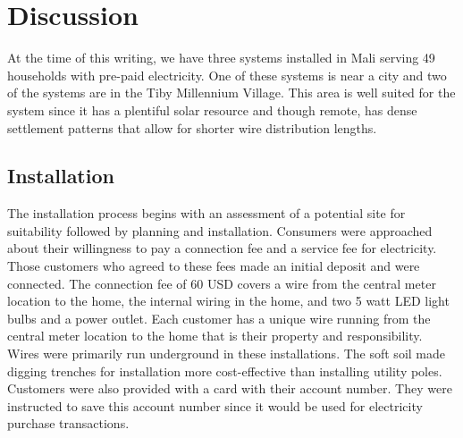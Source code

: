 \documentclass{sig-alternate}
\begin{document}
\section{Discussion}
At the time of this writing, we have three systems installed in Mali
serving 49 households with pre-paid electricity.
One of these systems is near a city and two of the systems are in the
Tiby Millennium Village.
This area is well suited for the system since it has
a plentiful solar resource and though remote, has dense settlement
patterns that allow for shorter wire distribution lengths.


\subsection{Installation}
The installation process begins with an assessment of a potential site for
suitability followed by planning and installation.
Consumers were
approached about their willingness to pay a connection fee and a service
fee for electricity.
Those customers who agreed to these fees made an initial deposit
and were connected.
The connection fee of 60 USD covers a wire from the central meter location
to the home, the internal wiring in the home, and two 5 watt LED light bulbs and a
power outlet.
Each customer has a unique wire running from the central meter location to
the home that is their property and responsibility.
Wires were primarily run underground in these installations.
The soft soil made digging trenches for installation more cost-effective than
installing utility poles.
Customers were also provided with a card with their account number.
They were instructed to save this account number since it would be used
for electricity purchase transactions.
\end{document}

